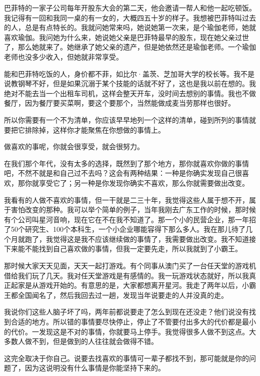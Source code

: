 巴菲特的一家子公司每年开股东大会的第二天，他会邀请一帮人和他一起吃顿饭。我记得有一回和我同一桌的有一女的，大概四五十岁的样子。我想被巴菲特叫过去的人，总是有点特长的。我就问她常来吗，她说她第一次来，是个瑜伽老师，她就喜欢瑜伽。我问她为什么来，她说她父亲是巴菲特最早的股东，现在她父亲过世了，那么她就来了。她继承了她父亲的遗产，但是她依然还是瑜伽老师。一个瑜伽老师也没多少收入，但她就非常享受。

能和巴菲特吃饭的人，身价都不菲，如比尔·盖茨、芝加哥大学的校长等。我不是说教钢琴不好，但是如果沉溺于某个技能的话就不好了，这也是我以前在想的。我绝对不能去当一个出租车司机，这样会整天开车，没时间去想别的事情。我也不做餐厅，因为餐厅要买菜啊，要这个要那个，当然能做成麦当劳那样也很好。

所以你需要有一个不为清单，你应该早早地列一个这样的清单，碰到所列的事情就要把它排除掉，这样你才能聚焦在你想做的事情上。

做喜欢的事呢，你就会很享受，就会很努力。

在我们那个年代，没有太多的选择，既然到了那个地方，那你就喜欢你做的事情吧，不然不就是和自己过不去吗？这会有两种结果：一种是你确实发现自己很喜欢，那你就享受它了；另一种是你发现你确实不喜欢，那么你就需要做出改变。

我看有的人做不喜欢的事情，但一干就是二三十年，我觉得这些人属于想不开，属于害怕改变的那种。我可以举个简单的例子，当年我刚去广东工作的时候，那时候有个公司叫星河音响，现在它在不在我不知道了。那一个小的民营企业，那一年招了50个研究生、100个本科生，一个小企业哪能容得下那么多人。我在那儿待了几个月就跑了，我觉得这是我不应该继续做的事情了，我需要做出改变。我不知道接下来能不能找到自己喜欢做的事情，但我一定要先走，所以我就到了小霸王。

那时候大家天天见面，天天一起打游戏。有个同事从澳门买了一台任天堂的游戏机借给我们玩了几天。我对任天堂游戏是有感情的。我一玩游戏状态就好，所以我真正起家是从游戏开始的。有意思的是，大家都想离开星河。我走了两年以后，小霸王都全国闻名了，然后我回去过一趟，发现当年说要走的人并没真的走。

我说你们这些人脑子坏了吗，两年前都说要走了怎么到现在还没走？他们说没有找到合适的地方。所以错的事情要尽快停止，停止了不管要付出多大的代价都是最小的代价。一发现这是不对的事情，你就要马上停手。我觉得很多人做不到这点。大多数人做不到，但是做到的人往往就会做得不错。


这完全取决于你自己。说要去找喜欢的事情可一辈子都找不到，那可能就是你的问题了，因为这说明没有什么事情是你能坚持下来的。

